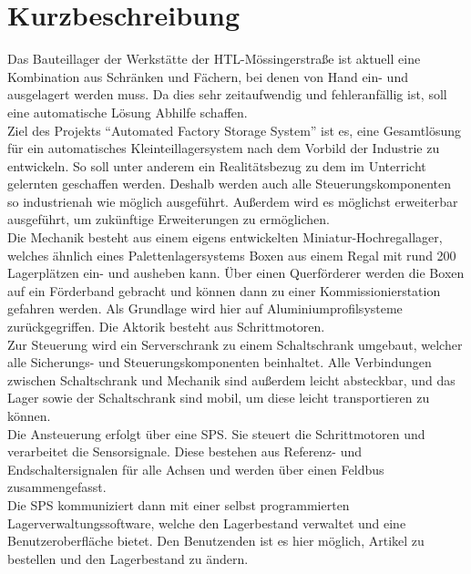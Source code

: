 \documentclass[12pt, twoside]{article}
\begin{document}
\newpage

\pagestyle{fancy}
\normalsize

\section*{Kurzbeschreibung}

Das Bauteillager der Werkstätte der HTL-Mössingerstraße ist aktuell eine Kombination aus Schränken und Fächern, bei denen von Hand ein- und ausgelagert werden muss. Da dies sehr zeitaufwendig und fehleranfällig ist, soll eine automatische Lösung Abhilfe schaffen. \\

Ziel des Projekts \enquote{Automated Factory Storage System} ist es, eine Gesamtlösung für ein automatisches Kleinteillagersystem nach dem Vorbild der Industrie zu entwickeln. So soll unter anderem ein Realitätsbezug zu dem im Unterricht gelernten geschaffen werden. Deshalb werden auch alle Steuerungskomponenten so industrienah wie möglich ausgeführt. Außerdem wird es möglichst erweiterbar ausgeführt, um zukünftige Erweiterungen zu ermöglichen.\\

Die Mechanik besteht aus einem eigens entwickelten Miniatur-Hochregallager, welches ähnlich eines Palettenlagersystems Boxen aus einem Regal mit rund 200 Lagerplätzen ein- und ausheben kann. Über einen Querförderer werden die Boxen auf ein Förderband gebracht und können dann zu einer Kommissionierstation gefahren werden. Als Grundlage wird hier auf Aluminiumprofilsysteme zurückgegriffen. Die Aktorik besteht aus Schrittmotoren.\\

Zur Steuerung wird ein Serverschrank zu einem Schaltschrank umgebaut, welcher alle Sicherungs- und Steuerungskomponenten beinhaltet. Alle Verbindungen zwischen Schaltschrank und Mechanik sind außerdem leicht absteckbar, und das Lager sowie der Schaltschrank sind mobil, um diese leicht transportieren zu können.\\

Die Ansteuerung erfolgt über eine SPS. Sie steuert die Schrittmotoren und verarbeitet die Sensorsignale. Diese bestehen aus Referenz- und Endschaltersignalen für alle Achsen und werden über einen Feldbus zusammengefasst. \\

Die SPS kommuniziert dann mit einer selbst programmierten Lagerverwaltungssoftware, welche den Lagerbestand verwaltet und eine Benutzeroberfläche bietet. Den Benutzenden ist es hier möglich, Artikel zu bestellen und den Lagerbestand zu ändern.\\
\end{document}
